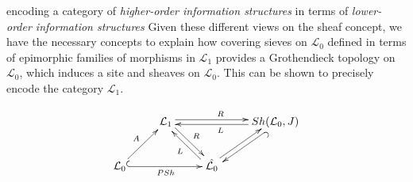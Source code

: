 \begin{frame}
\begin{block}{encoding a category of {\it higher-order information structures} in terms of {\it lower-order information structures}}
Given these different views on the sheaf concept, we have the necessary concepts to explain how covering sieves on $\mathcal{L}_0$ defined in terms of epimorphic families of morphisms in $\mathcal{L}_1$ provides a Grothendieck topology on $\mathcal{L}_0$, which induces a site and sheaves on $\mathcal{L}_0$. This can be shown to precisely encode the category $\mathcal{L}_1$.
\end{block}
\begin{block}{}
\begin{displaymath}
\xymatrix{
& \mathcal{L}_1 \ar@<0.5ex>[rd]^-{R} \ar@<0.5ex>[rr]^{R} & & Sh(\mathcal{L}_0,J) \ar@<0.5ex>[ll]^{L} \ar@{^{(}->}@<0.5ex>[dl]^{} \\
\mathcal{L}_0 \ar[ru]^{A} \ar@{^{(}->}[rr]_{PSh} & & \hat{\mathcal{L}_0} \ar@<0.5ex>[lu]^-{L} \ar@<0.5ex>[ur]^{}&
}
\end{displaymath}
\end{block}
\end{frame}